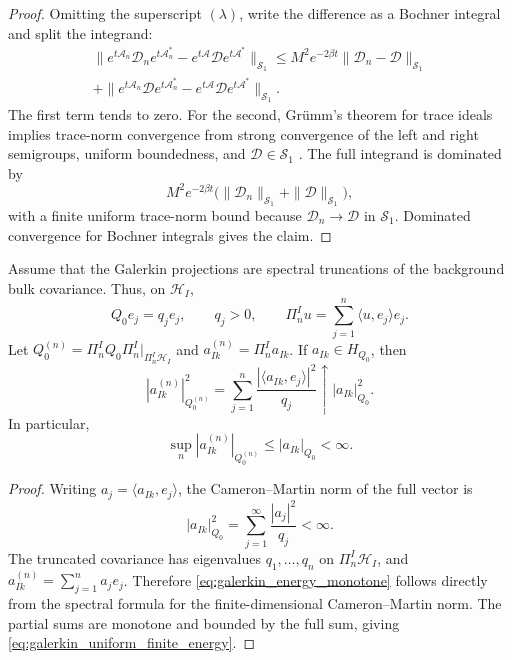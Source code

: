 \begin{proof}
Omitting the superscript $(\lambda)$, write the difference as a Bochner
integral and split the integrand:
\begin{multline*}
  \|e^{t\mathcal{A}_n}\mathcal{D}_ne^{t\mathcal{A}_n^*}
    -e^{t\mathcal{A}}\mathcal{D}e^{t\mathcal{A}^*}\|_{\mathcal{S}_1}
  \le
  M^2e^{-2\beta t}\|\mathcal{D}_n-\mathcal{D}\|_{\mathcal{S}_1}\\
  +
  \|e^{t\mathcal{A}_n}\mathcal{D}e^{t\mathcal{A}_n^*}
    -e^{t\mathcal{A}}\mathcal{D}e^{t\mathcal{A}^*}\|_{\mathcal{S}_1}.
\end{multline*}
The first term tends to zero.  For the second, Gr\"umm's theorem for trace
ideals implies trace-norm convergence from strong convergence of the left and
right semigroups, uniform boundedness, and $\mathcal{D}\in\mathcal{S}_1$
\cite{simon2005trace,daprato2014stochastic}.  The full integrand is dominated by
\[
  M^2e^{-2\beta t}
  \bigl(\|\mathcal{D}_n\|_{\mathcal{S}_1}
        +\|\mathcal{D}\|_{\mathcal{S}_1}\bigr),
\]
with a finite uniform trace-norm bound because
$\mathcal{D}_n\to\mathcal{D}$ in $\mathcal{S}_1$.  Dominated convergence for
Bochner integrals gives the claim.
\end{proof}

\begin{lemma}
\label{lem:galerkin_finite_energy_monotonicity}
Assume that the Galerkin projections are spectral truncations of the background
bulk covariance.  Thus, on $\mathcal{H}_I$,
\[
  Q_0e_j=q_je_j,
  \qquad q_j>0,
  \qquad
  \Pi_n^I u=\sum_{j=1}^n \langle u,e_j\rangle e_j.
\]
Let $Q_0^{(n)}=\Pi_n^I Q_0\Pi_n^I|_{\Pi_n^I\mathcal{H}_I}$ and
$a_{Ik}^{(n)}=\Pi_n^I a_{Ik}$.  If $a_{Ik}\in H_{Q_0}$, then
\begin{equation}
  |a_{Ik}^{(n)}|_{Q_0^{(n)}}^2
  =
  \sum_{j=1}^n\frac{|\langle a_{Ik},e_j\rangle|^2}{q_j}
  \uparrow
  |a_{Ik}|_{Q_0}^2.
  \label{eq:galerkin_energy_monotone}
\end{equation}
In particular,
\begin{equation}
  \sup_n |a_{Ik}^{(n)}|_{Q_0^{(n)}}
  \le |a_{Ik}|_{Q_0}<\infty.
  \label{eq:galerkin_uniform_finite_energy}
\end{equation}
\end{lemma}

\begin{proof}
Writing $a_j=\langle a_{Ik},e_j\rangle$, the Cameron--Martin norm of the
full vector is
\[
  |a_{Ik}|_{Q_0}^2=\sum_{j=1}^\infty\frac{|a_j|^2}{q_j}<\infty.
\]
The truncated covariance has eigenvalues $q_1,\ldots,q_n$ on
$\Pi_n^I\mathcal{H}_I$, and $a_{Ik}^{(n)}=\sum_{j=1}^n a_je_j$.  Therefore
\eqref{eq:galerkin_energy_monotone} follows directly from the spectral formula
for the finite-dimensional Cameron--Martin norm.  The partial sums are monotone
and bounded by the full sum, giving \eqref{eq:galerkin_uniform_finite_energy}.
\end{proof}

